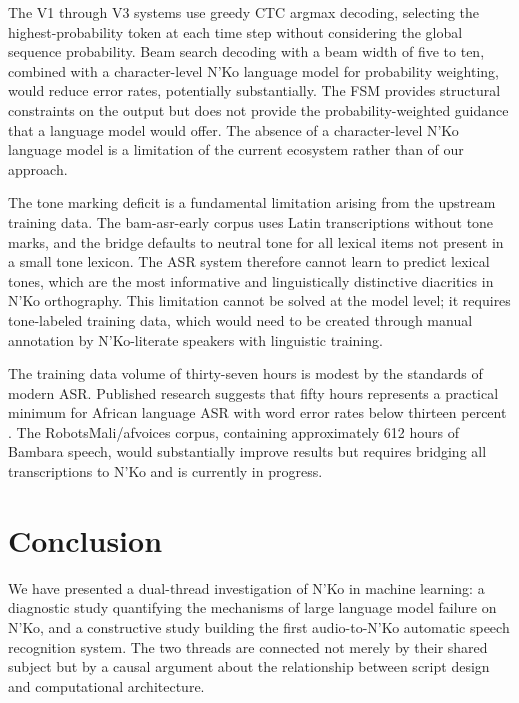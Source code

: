 \documentclass[11pt]{article}
\newcommand{\nko}{N'Ko}
\begin{document}
The V1 through V3 systems use greedy CTC argmax decoding, selecting the highest-probability token at each time step without considering the global sequence probability. Beam search decoding with a beam width of five to ten, combined with a character-level \nko{} language model for probability weighting, would reduce error rates, potentially substantially. The FSM provides structural constraints on the output but does not provide the probability-weighted guidance that a language model would offer. The absence of a character-level \nko{} language model is a limitation of the current ecosystem rather than of our approach.

The tone marking deficit is a fundamental limitation arising from the upstream training data. The bam-asr-early corpus uses Latin transcriptions without tone marks, and the bridge defaults to neutral tone for all lexical items not present in a small tone lexicon. The ASR system therefore cannot learn to predict lexical tones, which are the most informative and linguistically distinctive diacritics in \nko{} orthography. This limitation cannot be solved at the model level; it requires tone-labeled training data, which would need to be created through manual annotation by \nko{}-literate speakers with linguistic training.

The training data volume of thirty-seven hours is modest by the standards of modern ASR. Published research suggests that fifty hours represents a practical minimum for African language ASR with word error rates below thirteen percent \cite{data_scaling_2024}. The RobotsMali/afvoices corpus, containing approximately 612 hours of Bambara speech, would substantially improve results but requires bridging all transcriptions to \nko{} and is currently in progress.

\section{Conclusion}
\label{sec:conclusion}

We have presented a dual-thread investigation of \nko{} in machine learning: a diagnostic study quantifying the mechanisms of large language model failure on \nko{}, and a constructive study building the first audio-to-\nko{} automatic speech recognition system. The two threads are connected not merely by their shared subject but by a causal argument about the relationship between script design and computational architecture.
\end{document}
